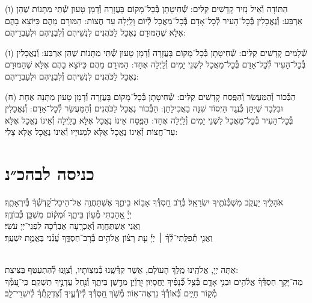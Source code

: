 \documentclass[twoside, openany, parskip=half, 11pt]{book}
\begin{document}
(ו) הַתּוֹדָה וְ֯אֵיל נָזִיר קׇדָשִׁים קַלִּים: שְׁ֯חִיטָתָן בְּ֯כׇל־מָקוֹם בָּעֲזָרָה וְ֯דָמָן טָעוּן שְׁ֯תֵּי מַתָּנוֹת שֶׁהֵן אַרְבַּע: וְ֯נֶאֱכָלִין בְּ֯כׇל־הָעִיר לְ֯כׇל־אָדָם בְּ֯כׇל־מַאֲכָל לְ֯יוֹם וָלַֽיְלָה עַד חֲצוֹת: הַמּוּרָם מֵהֶם כַּיּוֹצֵא בָהֶם אֶלָּא שֶׁהַמּוּרָם נֶאֱכָל לַכֹּהֲנִים לִנְשֵׁיהֶם וְ֯לִבְנֵיהֶם וּלְעַבְדֵיהֶם:

(ז) שְׁ֯לָמִים קׇדָשִׁים קַלִּים: שְׁ֯חִיטָתָן בְּ֯כׇל־מָקוֹם בָּעֲזָרָה וְ֯דָמָן טָעוּן שְׁ֯תֵּי מַתָּנוֹת שֶׁהֵן אַרְבַּע: וְ֯נֶאֱכָלִין בְּ֯כׇל־הָעִיר לְ֯כׇל־אָדָם בְּ֯כׇל־מַאֲכָל לִשְׁנֵי יָמִים וְ֯לַֽיְלָה אֶחָד: הַמּוּרָם מֵהֶם כַּיּוֹצֵא בָהֶם אֶלָּא שֶׁהַמּוּרָם נֶאֱכָל לַכֹּהֲנִים לִנְשֵׁיהֶם וְ֯לִבְנֵיהֶם וּלְעַבְדֵיהֶם:

(ח) הַבְּ֯כוֹר וְ֯הַמַּעֲשֵׂר וְ֯הַפֶּֽסַח קׇדָשִׁים קַלִּים: שְׁ֯חִיטָתָן בְּ֯כׇל־מָקוֹם בָּעֲזָרָה וְ֯דָמָן טָעוּן מַתָּנָה אֶחָת וּבִלְבָד שֶׁיִּתֵּן כְּ֯נֶֽגֶד הַיְסוֹד שִׁנָּה בַאֲכִילָתָן: הַבְּ֯כוֹר נֶאֱכָל לַכֹּהֲנִים וְ֯הַמַּעֲשֵׂר לְ֯כׇל־אָדָם: וְ֯נֶּאֱכָלִין בְּ֯כׇל־הָעִיר בְּ֯כׇל־מַאֲכָל לִשְׁנֵי יָמִים וְ֯לַֽיְלָה אֶחָד: הַפֶּֽסַח אֵינוֹ נֶאֱכָל אֶלָּא בַלַּֽיְלָה וְ֯אֵינוֹ נֶאֱכָל אֶלָּא עַד־חֲצוֹת וְ֯אֵינוֹ נֶאֱכָל אֶלָּא לִמְנוּיָיו וְ֯אֵינוֹ נֶאֱכָל אֶלָּא צָלִי:\\


\section[כניסה לבהכ״נ]{ כניסה לבהכ״נ }
אֹהָלֶ֖יךָ יַעֲקֹ֑ב מִשְׁכְּ֯נֹתֶ֖יךָ יִשְׂרָאֵֽל׃
בְּ֯רֹ֣ב חַ֭סְדְּ֯ךָ אָב֣וֹא בֵיתֶ֑ךָ אֶשְׁתַּחֲוֶ֥ה אֶל־הֵיכַל־קׇ֝דְשְׁ֯ךָ֗ בְּ֯יִרְאָתֶֽךָ׃\\
יְיָ֗ אָ֭הַבְתִּי מְ֯ע֣וֹן בֵּיתֶ֑ךָ וּ֝מְק֗וֹם מִשְׁכַּ֥ן כְּ֯בוֹדֶֽךָ׃ \\
וַאֲנִי אֶשְׁתַּחֲוֶה וְ֯אֶכְרָֽעָה אֶבְרְ֯כָה לִפְנֵי־יְיָ עֹשִׂי׃\\
וַאֲנִ֤י
%
תְ֯פִלָּֽתִי־לְ֯ךָ֨ ׀ יְיָ֡ עֵ֤ת רָצ֗וֹן אֱלֹהִ֥ים בְּ֯רׇב־חַסְדֶּ֑ךָ עֲ֝נֵ֗נִי בֶּאֱמֶ֥ת יִשְׁעֶֽךָ׃

\\
אַתָּה יְיָ, אֱלֹהֵֽינוּ מֶֽלֶךְ הָעוֹלָם, אֲשֶׁר קִדְּ֯שָֽׁנוּ בְּ֯מִצְוֹתָיו, וְ֯צִוָּֽנוּ לְ֯הִתְעַטֵּף בַּצִּיצִת:\\
מַה־יָּקָ֥ר חַסְדְּ֯ךָ֗ אֱלֹ֫הִ֥ים וּבְנֵ֥י אָדָ֑ם בְּ֯צֵ֥ל כְּ֯֝נָפֶ֗יךָ יֶחֱסָיֽוּן׃
יִ֭רְוְ֯יֻן מִדֶּ֣שֶׁן בֵּיתֶ֑ךָ וְ֯נַ֖חַל עֲדָנֶ֣יךָ תַשְׁקֵֽם׃
כִּֽי־עִ֭מְּ֯ךָ מְ֯ק֣וֹר חַיִּ֑ים בְּ֯֝אוֹרְ֯ךָ֗ נִרְאֶה־אֽוֹר׃
מְ֯שֹׁ֣ךְ חַ֭סְדְּ֯ךָ לְ֯יֹדְ֯עֶ֑יךָ וְ֯֝צִדְקָֽתְ֯ךָ֗ לְ֯יִשְׁרֵי־לֵֽב׃
\end{document}
